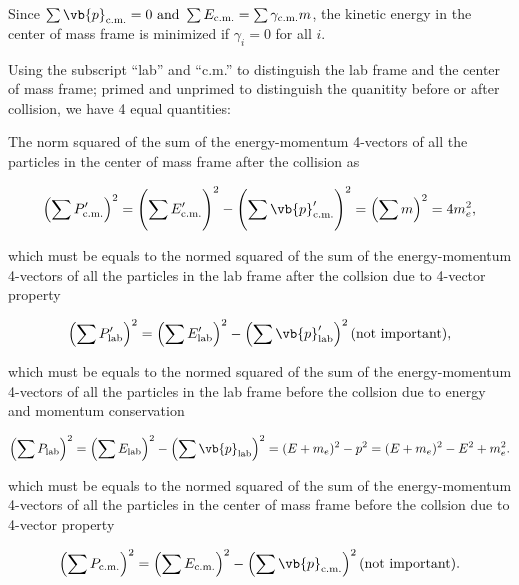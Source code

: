 \documentclass[english,a4paper,12pt]{report}
\begin{document}
{Since \(\sum \vb{p}_{\text{c.m.}}  =0 \text { and } \sum E_{\text{c.m.}} = \sum \gamma _{\text{c.m.}}m  \), the kinetic energy in the center of mass frame is minimized if \(\gamma _{i} = 0\) for all \(i\). 

Using the subscript ``lab'' and ``c.m.'' to distinguish the lab frame and the center of mass frame; primed and unprimed to distinguish the quanitity before or after collision, we have 4 equal quantities:

The norm squared of the sum of the energy-momentum 4-vectors of all the particles in the center of mass frame after the collision as 

\begin{equation}
    \left( \sum P_{\text{c.m.}}' \right)^2 = \left( \sum_{}^{} E_{\text{c.m.}}'  \right) ^2 - \left( \sum_{}^{} \vb{p}_{\text{c.m.}}'    \right) ^2  = \left( \sum m \right)^2 = 4 m_{e}^2,
\end{equation}

which must be equals to the normed squared of the sum of the energy-momentum 4-vectors of all the particles in the lab frame after the collsion due to 4-vector property

\begin{equation}
    \left(\sum P_{\text{lab} }' \right)^2 = \left(\sum E_{\text{lab} }'\right)^2 - \left( \sum \vb{p} _{\text{lab} }' \right)^2 \text{(not important)},
\end{equation}

which must be equals to the normed squared of the sum of the energy-momentum 4-vectors of all the particles in the lab frame before the collsion due to energy and momentum conservation

\begin{equation}
    \left(\sum P_{\text{lab} } \right)^2 = \left(\sum E_{\text{lab} }\right)^2 - \left( \sum \vb{p} _{\text{lab} } \right)^2 = (E+m_{e} )^2 - p^2 = (E+m_{e} )^2 - E^2 + m_{e}^2. 
\end{equation}

which must be equals to the normed squared of the sum of the energy-momentum 4-vectors of all the particles in the center of mass frame before the collsion due to 4-vector property

\begin{equation}
    \left(\sum P_{\text{c.m.} } \right)^2 = \left(\sum E_{\text{c.m.} }\right)^2 - \left( \sum \vb{p} _{\text{c.m.} } \right)^2 \text{(not important)}. 
\end{equation}

}
\end{document}
